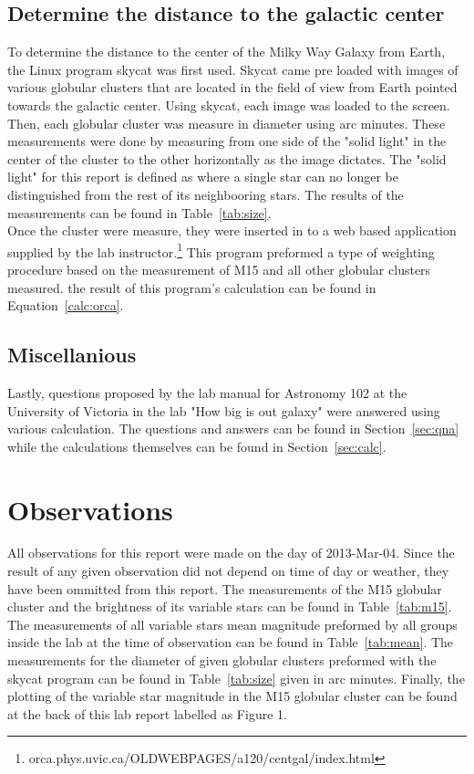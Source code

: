 \documentclass{article}
\begin{document}
\subsection{Determine the distance to the galactic center}

To determine the distance to the center of the Milky Way Galaxy from Earth, the Linux
program skycat was first used. Skycat came pre loaded with images of various globular
clusters that are located in the field of view from Earth pointed towards the 
galactic center. Using skycat, each image was loaded to the screen. Then, each globular
cluster was measure in diameter using arc minutes. These measurements were done by 
measuring from one side of the "solid light" in the center of the cluster to the other
horizontally as the image dictates. The "solid light" for this report is defined as
where a single star can no longer be distinguished from the rest of its neighbooring 
stars. The results of the measurements can be found in Table~\ref{tab:size}. \\

Once the cluster were measure, they were inserted in to a web based application supplied
by the lab instructor.\footnote{orca.phys.uvic.ca/OLDWEBPAGES/a120/centgal/index.html}
This program preformed a type of weighting procedure based on the measurement of M15
and all other globular clusters measured. the result of this program's calculation
can be found in Equation~\ref{calc:orca}.

\subsection{Miscellanious}

Lastly, questions proposed by the lab manual for Astronomy 102 at the University of
Victoria in the lab "How big is out galaxy" were answered using various calculation.
The questions and answers can be found in Section~\ref{sec:qna} while the calculations
themselves can be found in Section~\ref{sec:calc}.


\section{Observations}

All observations for this report were made on the day of 2013-Mar-04. Since the result
of any given observation did not depend on time of day or weather, they have been ommitted
from this report. The measurements of the M15 globular cluster and the brightness of its
variable stars can be found in Table~\ref{tab:m15}. The measurements of all variable stars
mean magnitude preformed by all groups inside the lab at the time of observation can 
be found in Table~\ref{tab:mean}. The measurements for the diameter of given globular
clusters preformed with the skycat program can be found in Table~\ref{tab:size} given
in arc minutes. Finally, the plotting of the variable star magnitude in the M15 globular
cluster can be found at the back of this lab report labelled as Figure 1.
\end{document}
